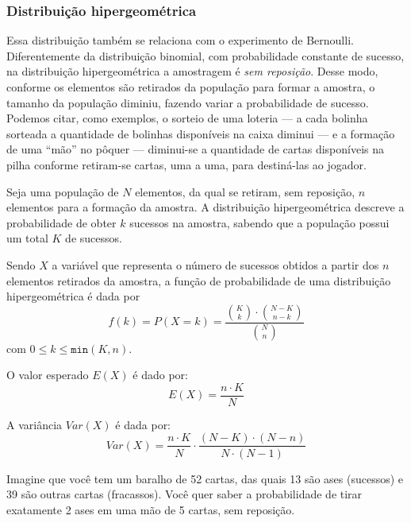 \subsubsection{Distribuição hipergeométrica}

Essa distribuição também se relaciona com o experimento de Bernoulli.
Diferentemente da distribuição binomial, com probabilidade constante de
sucesso, na distribuição hipergeométrica a amostragem é \emph{sem reposição}.
Desse modo, conforme os elementos são retirados da população para formar a
amostra, o tamanho da população diminiu, fazendo variar a probabilidade de
sucesso. Podemos citar, como exemplos, o sorteio de uma loteria --- a cada
bolinha sorteada a quantidade de bolinhas disponíveis na caixa diminui --- e a
formação de uma ``mão'' no pôquer --- diminui-se a quantidade de cartas
disponíveis na pilha conforme retiram-se cartas, uma a uma, para destiná-las ao
jogador.

Seja uma população de $N$ elementos, da qual se retiram, sem reposição, $n$
elementos para a formação da amostra. A distribuição hipergeométrica descreve a
probabilidade de obter $k$ sucessos na amostra, sabendo que a população possui
um total $K$ de sucessos.

Sendo $X$ a variável que representa o número de sucessos obtidos a partir dos
$n$ elementos retirados da amostra, a função de probabilidade de uma
distribuição hipergeométrica é dada por
\begin{equation}
    f(k) = P(X=k) = \frac{\binom{K}{k} \cdot \binom{N-K}{n-k}}{\binom{N}{n}}
    \label{eq:dist-hipergeometrica}
\end{equation}
com $0 \leq k \leq \texttt{min}(K,n)$.

O valor esperado $E(X)$ é dado por:
\begin{equation}
    E(X) = \frac{n \cdot K}{N}
    \label{eq:esperanca-dist-hipergeo}
\end{equation}

A variância $Var(X)$ é dada por:
\begin{equation}
    Var(X) = \frac{n \cdot K}{N} \cdot \frac{(N-K) \cdot (N-n)}{N \cdot (N-1)}
    \label{eq:variancia-dist-hipergeo}
\end{equation}

\begin{eg}
Imagine que você tem um baralho de 52 cartas, das quais 13 são ases (sucessos)
e 39 são outras cartas (fracassos). Você quer saber a probabilidade de tirar
exatamente 2 ases em uma mão de 5 cartas, sem reposição.
\label{eg:baralho-ases}
\end{eg}

